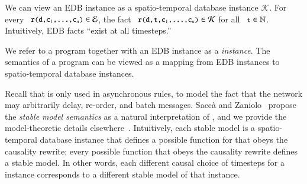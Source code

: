 We can view an EDB instance as a spatio-temporal database instance $\mathcal{K}$.  For every $\dedalus{r(d,c\sub{1},\ldots,c\sub{n})} \in \mathcal{E}$, the fact \linebreak $\dedalus{r(d,t,c\sub{1},\ldots,c\sub{n})} \in \mathcal{K}$ for all $\dedalus{t} \in \mathbb{N}$.  Intuitively, EDB facts ``exist at all timesteps.''


We refer to a \lang program together with an EDB instance as a {\em \lang instance}.  The semantics of a \lang program can be viewed as a mapping from EDB instances to spatio-temporal database instances.

Recall that  is only used in asynchronous rules, to model the fact that the network may arbitrarily delay, re-order, and batch messages.
Sacc\`{a} and Zaniolo~\cite{sacca-zaniolo} propose the {\em stable model semantics} as a natural interpretation of , and we provide the model-theoretic details elsewhere~\cite{ameloot-operational}.  Intuitively, each stable model is a spatio-temporal database instance that defines a possible function for  that obeys the causality rewrite; every possible function that obeys the causality rewrite defines a stable model.  %
In other words, each different causal choice of timesteps for a \lang instance corresponds to a different stable model of that instance.

